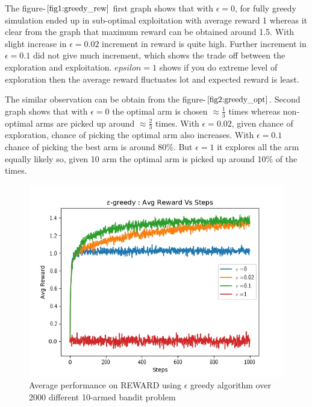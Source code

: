 \documentclass[preprint,12pt]{elsarticle}
\begin{document}
	The figure-$\ref{fig1:greedy_rew}$ first graph shows that with $\epsilon = 0$, for fully greedy simulation ended up in sub-optimal exploitation with average reward  1 whereas it clear from the graph that maximum reward can be obtained around 1.5. With slight increase in $\epsilon=0.02$ increment in reward is quite high. Further increment in $\epsilon=0.1$ did not give much increment, which shows the trade off between the exploration and exploitation.
	$epsilon=1$ shows if you do extreme level of exploration then the average reward fluctuates lot and expected reward is least.
	
	The similar observation can be obtain from the figure-$\ref{fig2:greedy_opt}$. Second graph shows that with $\epsilon =0$ the optimal arm is chosen $\approx \frac{1}{3}$ times whereas non-optimal arms are picked up around $\approx \frac{2}{3}$ times. With $\epsilon=0.02$, given chance of exploration, chance of picking the optimal arm also increases. With $\epsilon=0.1$  chance of picking the best arm is around 80$\%$. But $\epsilon=1$ it explores all the arm equally likely so, given 10 arm the optimal arm is picked up around 10$\%$ of the times.
	
	
	 \begin{figure}[H]
	 	\centering
	 	\includegraphics[scale=0.7]{./reward_epsilon.jpg}
	 	\hspace{0.25cm}
	 	\caption{Average performance on REWARD using $\epsilon$ greedy algorithm over 2000 different 10-armed bandit problem}
		 \label{fig1:greedy_rew}
	 \end{figure}
	 
\end{document}
